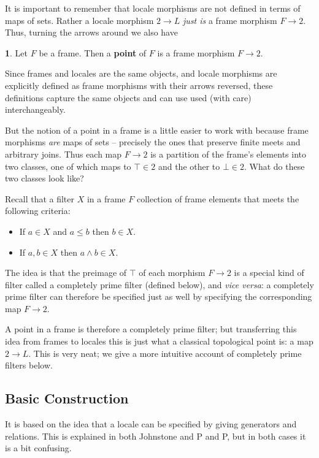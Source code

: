 \documentclass[oneside,english]{amsbook}
\numberwithin{section}{chapter}
\theoremstyle{plain}
\theoremstyle{definition}
\newtheorem{defn}[thm]{\protect\definitionname}
\providecommand{\definitionname}{Definition}
\begin{document}
It is important to remember that locale morphisms are not defined in terms of maps of sets. Rather a locale morphism $2\to L$ \emph{just is} a frame morphism $F \to 2$. Thus, turning the arrows around we also have

\begin{defn}
	Let $F$ be a frame. Then a \textbf{point} of $F$ is a frame morphism $F\to 2$.
\end{defn}

Since frames and locales are the same objects, and locale morphisms are explicitly defined as frame morphisms with their arrows reversed, these definitions capture the same objects and can use used (with care) interchangeably. 

But the notion of a point in a frame is a little easier to work with because frame morphisms \emph{are} maps of sets -- precisely the ones that preserve finite meets and arbitrary joins. Thus each map $F\to 2$ is a partition of the frame's elements into two classes, one of which maps to $\top\in 2$ and the other to $\bot\in 2$. What do these two classes look like?

Recall that a filter $X$ in a frame $F$ collection of frame elements that meets the following criteria: 
\begin{itemize} 
	\item If $a\in X$ and $a\le b$ then $b\in X$. 
	\item If $a, b\in X$ then $a\land b\in X$. 
\end{itemize}
The idea is that the preimage of $\top$ of each morphism $F\to 2$ is a special kind of filter called a completely prime filter (defined below), and \emph{vice versa}: a completely prime filter can therefore be specified just as well by specifying the corresponding map $F\to 2$.

A point in a frame is therefore a completely prime filter; but transferring this idea from frames to locales this is just what a classical topological point is: a map $2\to L$. This is very neat; we give a more intuitive account of completely prime filters below.

\subsection{Basic Construction}

It is based on the idea that a locale can be specified by giving generators and relations. This is explained in both Johnstone and P and P, but in both cases it is a bit confusing.
\end{document}
